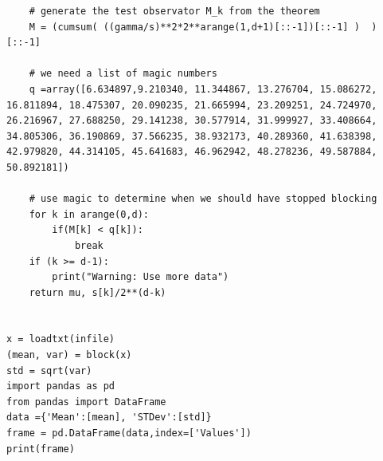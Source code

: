 \documentclass{beamer}
\begin{document}
\begin{frame}
\begin{verbatim}
    # generate the test observator M_k from the theorem
    M = (cumsum( ((gamma/s)**2*2**arange(1,d+1)[::-1])[::-1] )  )[::-1]

    # we need a list of magic numbers
    q =array([6.634897,9.210340, 11.344867, 13.276704, 15.086272, 16.811894, 18.475307, 20.090235, 21.665994, 23.209251, 24.724970, 26.216967, 27.688250, 29.141238, 30.577914, 31.999927, 33.408664, 34.805306, 36.190869, 37.566235, 38.932173, 40.289360, 41.638398, 42.979820, 44.314105, 45.641683, 46.962942, 48.278236, 49.587884, 50.892181])

    # use magic to determine when we should have stopped blocking
    for k in arange(0,d):
        if(M[k] < q[k]):
            break
    if (k >= d-1):
        print("Warning: Use more data")
    return mu, s[k]/2**(d-k)


x = loadtxt(infile)
(mean, var) = block(x) 
std = sqrt(var)
import pandas as pd
from pandas import DataFrame
data ={'Mean':[mean], 'STDev':[std]}
frame = pd.DataFrame(data,index=['Values'])
print(frame)


\end{verbatim}
\end{frame}
\end{document}

